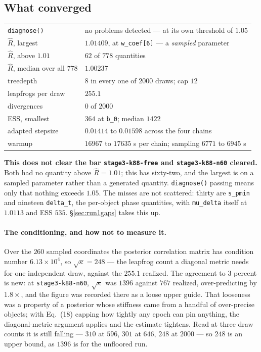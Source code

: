 \documentclass[11pt]{article}
\newcommand{\file}[1]{\texttt{#1}}
\newcommand{\code}[1]{\texttt{#1}}
\begin{document}
\subsection{What converged}
\label{sec:run1conv}

\begin{tabular}{@{}l l@{}}
\toprule
\code{diagnose()} & no problems detected --- at its own threshold of $1.05$ \\
$\hat R$, largest & $1.01409$, at \code{w\_coef[6]} --- a \emph{sampled} parameter \\
$\hat R$, above $1.01$ & $62$ of $778$ quantities \\
$\hat R$, median over all $778$ & $1.00237$ \\
treedepth & $8$ in every one of $2000$ draws; cap $12$ \\
leapfrogs per draw & $255.1$ \\
divergences & $0$ of $2000$ \\
ESS, smallest & $364$ at \code{b\_0}; median $1422$ \\
adapted stepsize & $0.01414$ to $0.01598$ across the four chains \\
warmup & $16967$ to $17635$ s per chain; sampling $6771$ to $6945$ s \\
\bottomrule
\end{tabular}

\medskip\noindent
\textbf{This does not clear the bar \file{stage3-k88-free} and \file{stage3-k88-n60}
cleared.} Both had no quantity above $\hat R = 1.01$; this has sixty-two, and the largest
is on a sampled parameter rather than a generated quantity. \code{diagnose()} passing means
only that nothing exceeds $1.05$. The misses are not scattered: thirty are \code{s\_pmin}
and nineteen \code{delta\_t}, the per-object phase quantities, with \code{mu\_delta} itself
at $1.0113$ and ESS $535$. \S\ref{sec:run1gaps} takes this up.

\paragraph{The conditioning, and how not to measure it.} Over the $260$ sampled
coordinates the posterior correlation matrix has condition number $6.13\times10^{4}$, so
$\sqrt{\kappa} = 248$ --- the leapfrog count a diagonal metric needs for one independent
draw, against the $255.1$ realized. The agreement to $3$ percent is new: at
\file{stage3-k88-n60}, $\sqrt{\kappa}$ was $1396$ against $767$ realized, over-predicting
by $1.8\times$, and the figure was recorded there as a loose upper guide. That looseness
was a property of a posterior whose stiffness came from a handful of over-precise objects;
with Eq.~(18) capping how tightly any epoch can pin anything, the diagonal-metric
argument applies and the estimate tightens. Read at three draw counts it is still falling
--- $310$ at $596$, $301$ at $646$, $248$ at $2000$ --- so $248$ is an upper bound, as
$1396$ is for the unfloored run.
\end{document}
